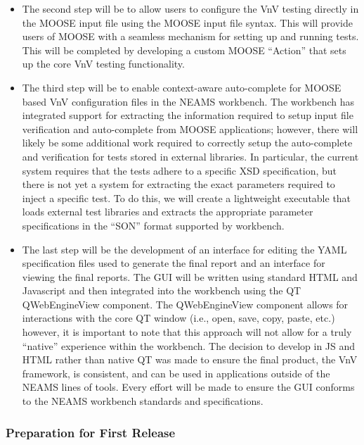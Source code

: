 \begin{itemize}
 \item The second step will be to allow users to configure the VnV testing directly in the MOOSE input file using the MOOSE input
file syntax. This will provide users of MOOSE with a seamless mechanism for setting up and running tests. This will be completed by
developing a custom MOOSE ``Action'' that sets up the core VnV testing functionality. 
\item The third step will be to enable context-aware auto-complete for MOOSE based VnV configuration files in the NEAMS workbench. The workbench
has integrated support for extracting the information required to setup input file verification and auto-complete from MOOSE applications; however, there
will likely be some additional work required to correctly setup the auto-complete and verification for tests stored in external libraries. In particular, the current system 
requires that the tests adhere to a specific XSD specification, but there is not yet a system for extracting the exact parameters required to inject a specific test. To do this, we will create a lightweight executable that loads external test libraries and extracts the appropriate parameter specifications in the ``SON'' format supported by workbench.  
\item The last step will be the development of an interface for editing the YAML specification files used to generate the final report and an interface 
for viewing the final reports. The GUI will be written using standard HTML and Javascript and then integrated into the workbench using the QT QWebEngineView component. The QWebEngineView component allows for interactions with the core QT window (i.e., open, save, copy, paste, etc.) however, it is important to note that this approach will not allow for a truly ``native'' experience within the workbench. The decision to develop in JS and HTML rather than native QT was made to ensure the final product, the VnV framework, is consistent, and can be used in applications outside of the NEAMS lines of tools. Every effort will be made to ensure the GUI conforms to the NEAMS workbench standards and specifications. 
\end{itemize}

\subsubsection{Preparation for First Release} 

